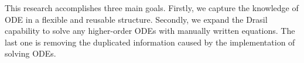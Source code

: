 This research accomplishes three main goals. Firstly, we capture the knowledge of ODE in a flexible and reusable structure. Secondly, we expand the Drasil capability to solve any higher-order ODEs with manually written equations. The last one is removing the duplicated information caused by the implementation of solving ODEs.








